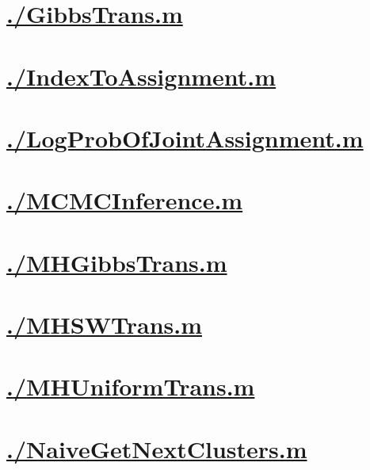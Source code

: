 \documentclass{article}
\begin{document}
    \section{\hyperref[toc]{./GibbsTrans.m}}
        \newpage
    \section{\hyperref[toc]{./IndexToAssignment.m}}
        \newpage
    \section{\hyperref[toc]{./LogProbOfJointAssignment.m}}
        \newpage
    \section{\hyperref[toc]{./MCMCInference.m}}
        \newpage
    \section{\hyperref[toc]{./MHGibbsTrans.m}}
        \newpage
    \section{\hyperref[toc]{./MHSWTrans.m}}
        \newpage
    \section{\hyperref[toc]{./MHUniformTrans.m}}
        \newpage
    \section{\hyperref[toc]{./NaiveGetNextClusters.m}}
        \newpage
\end{document}
